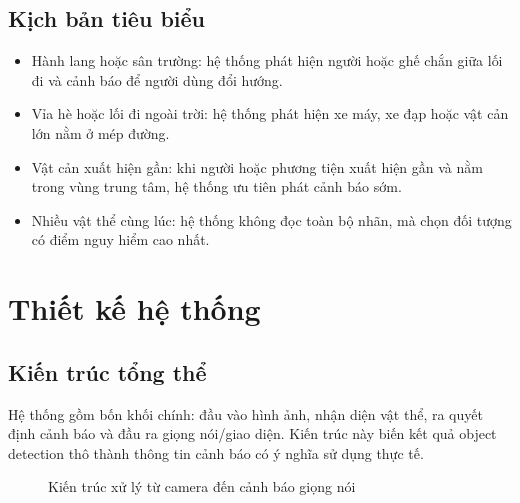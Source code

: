 \documentclass[twoside,final]{hcmut-report}
\begin{document}
\subsection{Kịch bản tiêu biểu}
\begin{itemize}
  \item Hành lang hoặc sân trường: hệ thống phát hiện người hoặc ghế chắn giữa lối đi và cảnh báo để người dùng đổi hướng.
  \item Vỉa hè hoặc lối đi ngoài trời: hệ thống phát hiện xe máy, xe đạp hoặc vật cản lớn nằm ở mép đường.
  \item Vật cản xuất hiện gần: khi người hoặc phương tiện xuất hiện gần và nằm trong vùng trung tâm, hệ thống ưu tiên phát cảnh báo sớm.
  \item Nhiều vật thể cùng lúc: hệ thống không đọc toàn bộ nhãn, mà chọn đối tượng có điểm nguy hiểm cao nhất.
\end{itemize}

\section{Thiết kế hệ thống}

\subsection{Kiến trúc tổng thể}
Hệ thống gồm bốn khối chính: đầu vào hình ảnh, nhận diện vật thể, ra quyết định cảnh báo và đầu ra giọng nói/giao diện. Kiến trúc này biến kết quả object detection thô thành thông tin cảnh báo có ý nghĩa sử dụng thực tế.

\begin{figure}[H]
  \centering
  \caption{Kiến trúc xử lý từ camera đến cảnh báo giọng nói}
  \label{fig:architecture}
\end{figure}
\end{document}
